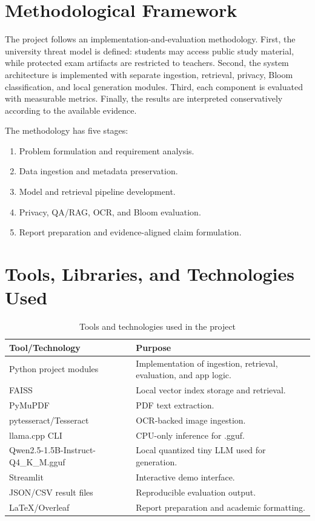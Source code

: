\section{Methodological Framework}

The project follows an implementation-and-evaluation methodology. First, the university threat model is defined: students may access public study material, while protected exam artifacts are restricted to teachers. Second, the system architecture is implemented with separate ingestion, retrieval, privacy, Bloom classification, and local generation modules. Third, each component is evaluated with measurable metrics. Finally, the results are interpreted conservatively according to the available evidence.

The methodology has five stages:
\begin{enumerate}
    \item Problem formulation and requirement analysis.
    \item Data ingestion and metadata preservation.
    \item Model and retrieval pipeline development.
    \item Privacy, QA/RAG, OCR, and Bloom evaluation.
    \item Report preparation and evidence-aligned claim formulation.
\end{enumerate}

\section{Tools, Libraries, and Technologies Used}

\begin{table}[H]
\centering
\caption{Tools and technologies used in the project}
\label{tab:tools}
\begin{tabular}{p{}p{}}
\toprule

\textbf{Tool/Technology} & \textbf{Purpose}\\
\midrule
Python project modules & Implementation of ingestion, retrieval, evaluation, and app logic.\\ \hline
FAISS & Local vector index storage and retrieval.\\ \hline
PyMuPDF & PDF text extraction.\\ \hline
pytesseract/Tesseract & OCR-backed image ingestion.\\ \hline
llama.cpp CLI & CPU-only inference for \qwenmodel{}.gguf.\\ \hline
Qwen2.5-1.5B-Instruct-Q4\_K\_M.gguf & Local quantized tiny LLM used for generation.\\ \hline
Streamlit & Interactive demo interface.\\ \hline
JSON/CSV result files & Reproducible evaluation output.\\ \hline
LaTeX/Overleaf & Report preparation and academic formatting.\\ 
\bottomrule
\end{tabular}
\end{table}

